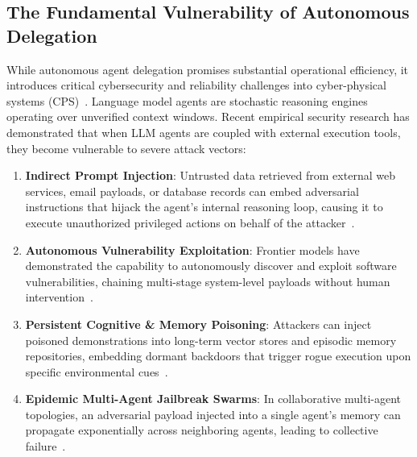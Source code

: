 \documentclass[journal]{IEEEtran}
\begin{document}
\subsection{The Fundamental Vulnerability of Autonomous Delegation}
While autonomous agent delegation promises substantial operational efficiency, it introduces critical cybersecurity and reliability challenges into cyber-physical systems (CPS)~\cite{ruan2024identifying}. Language model agents are stochastic reasoning engines operating over unverified context windows. Recent empirical security research has demonstrated that when LLM agents are coupled with external execution tools, they become vulnerable to severe attack vectors:
\begin{enumerate}[leftmargin=12pt, topsep=2pt, itemsep=1pt]
\item \textbf{Indirect Prompt Injection}: Untrusted data retrieved from external web services, email payloads, or database records can embed adversarial instructions that hijack the agent's internal reasoning loop, causing it to execute unauthorized privileged actions on behalf of the attacker~\cite{greshake2023not}.
\item \textbf{Autonomous Vulnerability Exploitation}: Frontier models have demonstrated the capability to autonomously discover and exploit software vulnerabilities, chaining multi-stage system-level payloads without human intervention~\cite{fang2024llm, deng2024pentestgpt}.
\item \textbf{Persistent Cognitive \& Memory Poisoning}: Attackers can inject poisoned demonstrations into long-term vector stores and episodic memory repositories, embedding dormant backdoors that trigger rogue execution upon specific environmental cues~\cite{chen2024agentpoison}.
\item \textbf{Epidemic Multi-Agent Jailbreak Swarms}: In collaborative multi-agent topologies, an adversarial payload injected into a single agent's memory can propagate exponentially across neighboring agents, leading to collective failure~\cite{shen2024agent, lee2024prompt}.
\end{enumerate}
\end{document}
